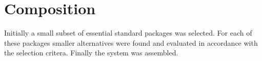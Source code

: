 \section{Composition}\label{Composition}

Initially a small subset of essential standard packages was selected. For each of these packages smaller alternatives were found and evaluated in accordance with the selection critera. Finally the system was assembled.



